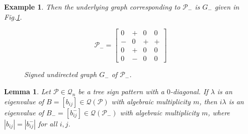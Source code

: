 \documentclass[a4paper, 10pt]{article}
\newtheorem{lemma}{Lemma}[section]
\newtheorem{eg}{Example}[section]
\numberwithin{equation}{section}
\begin{document}
\begin{eg}
		Then the underlying graph corresponding to $\mathcal{P}_-$ is $G_-$ given in Fig.\ref{fign2}.
		\begin{figure}[H]
			\centering
			\begin{minipage}{0.45\textwidth}
				\vspace{-1cm}
				\[
				\mathcal{P}_-=
				\begin{bmatrix}
					0 & + & 0 & 0 \\
					- & 0 & + & + \\
					0 & + & 0 & 0 \\
					0 & - & 0 & 0
				\end{bmatrix}
				\]
			\end{minipage}\hfill
			\begin{minipage}{0.45\textwidth}
				\centering
				\caption{Signed undirected graph $G_-$ of $\mathcal{P}_-$.}
				\label{fign2}
			\end{minipage}
		\end{figure}
		
	\end{eg}
	\begin{lemma} \label{3.1} Let $\mathcal{P}\in \mathcal{Q}_n$ be a tree sign pattern with a $0$-diagonal.
		If $\lambda$ is an eigenvalue of $B=[b_{ij}]\in \mathcal{Q}(\mathcal{P})$ with algebraic multiplicity $m$, then $i\lambda$ is an eigenvalue of $B_-=[b^-_{ij}] \in \mathcal{Q}(\mathcal{P}_-)$ with algebraic multiplicity $m$, where $|b_{ij}|=|b^-_{ij}|$ for all $i,j$.
	\end{lemma}
\end{document}
